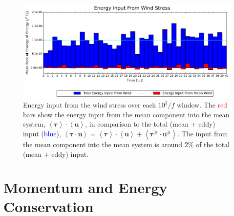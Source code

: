 \documentclass[12pt,a4paper]{report}
\newcommand*\nthkmean[1]{\left\langle{#1}\right\rangle}
\newcommand*\nthkres[1]{{#1}^{\#}}
\begin{document}
\begin{figure}
	\centering
	\includegraphics[width=\linewidth]{meaneddywind}
	\caption{ Energy input from the wind stress over each $10^{3}/f$ window. 
		The \textcolor{red}{red} bars show the energy input from
		the mean component into the mean system,
		$\nthkmean{\boldsymbol{\tau}}\cdot\nthkmean{\boldsymbol{u}}$, in comparison
		to the total (mean + eddy) input (\textcolor{blue}{blue}), $\nthkmean{\boldsymbol{\tau}\cdot\boldsymbol{u}}
		=\nthkmean{\boldsymbol{\tau}}\cdot\nthkmean{\boldsymbol{u}}+\nthkmean{\nthkres{\boldsymbol{\tau}}\cdot\nthkres{\boldsymbol{u}}}$. The input from
		the mean component into the mean system is around $2\%$ of
		the total (mean + eddy) input.}
	\label{fig:meaneddywind}
\end{figure}



\section{Momentum and Energy Conservation}
\end{document}
